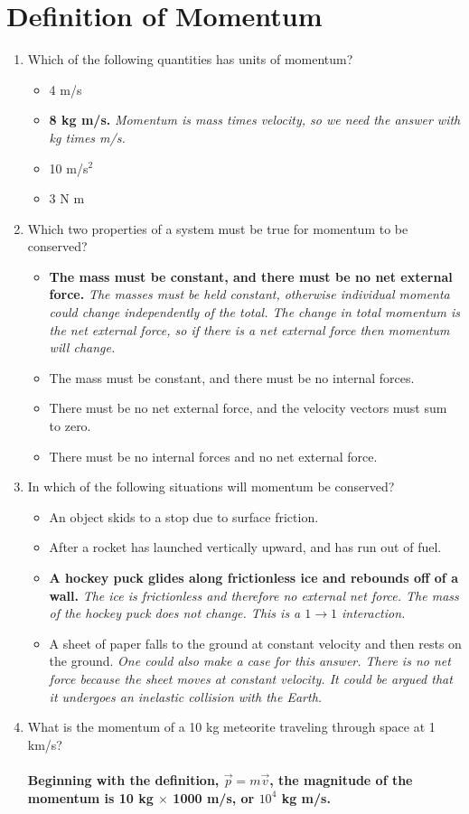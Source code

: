 \documentclass[10pt]{article}
\begin{document}
\maketitle

\section{Definition of Momentum}
\begin{enumerate}
\item Which of the following quantities has units of momentum?
\begin{itemize}
\item 4 m/s
\item \textbf{8 kg m/s.}  \textit{Momentum is mass times velocity, so we need the answer with kg times m/s.}
\item 10 m/s$^2$
\item 3 N m
\end{itemize}
\item Which two properties of a system must be true for momentum to be conserved?
\begin{itemize}
\item \textbf{The mass must be constant, and there must be no net external force.}  \textit{The masses must be held constant, otherwise individual momenta could change independently of the total.  The change in total momentum is the net external force, so if there is a net external force then momentum will change.}
\item The mass must be constant, and there must be no internal forces.
\item There must be no net external force, and the velocity vectors must sum to zero.
\item There must be no internal forces and no net external force.
\end{itemize}
\item In which of the following situations will momentum be conserved?
\begin{itemize}
\item An object skids to a stop due to surface friction.
\item After a rocket has launched vertically upward, and has run out of fuel.
\item \textbf{A hockey puck glides along frictionless ice and rebounds off of a wall.}  \textit{The ice is frictionless and therefore no external net force.  The mass of the hockey puck does not change.  This is a $1 \rightarrow 1$ interaction.}
\item A sheet of paper falls to the ground at constant velocity and then rests on the ground.  \textit{One could also make a case for this answer.  There is no net force because the sheet moves at constant velocity.  It could be argued that it undergoes an inelastic collision with the Earth.}
\end{itemize}
\item What is the momentum of a 10 kg meteorite traveling through space at 1 km/s? \\ \\
\textbf{Beginning with the definition, $\vec{p} = m\vec{v}$, the magnitude of the momentum is 10 kg $\times$ 1000 m/s, or $10^{4}$ kg m/s.}
\end{enumerate}
\end{document}
